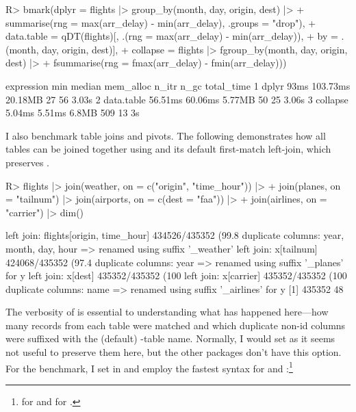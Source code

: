 \documentclass[nojss]{jss} %
\newcommand{\fct}[1]{\code{#1()}}
\begin{document}
%
\begin{Schunk}
\begin{Sinput}
R> bmark(dplyr = flights |> group_by(month, day, origin, dest) |>
+      summarise(rng = max(arr_delay) - min(arr_delay), .groups = "drop"),
+    data.table = qDT(flights)[, .(rng = max(arr_delay) - min(arr_delay)),
+                              by = .(month, day, origin, dest)],
+    collapse = flights |> fgroup_by(month, day, origin, dest) |>
+      fsummarise(rng = fmax(arr_delay) - fmin(arr_delay)))
\end{Sinput}
\begin{Soutput}
  expression     min   median mem_alloc n_itr n_gc total_time
1      dplyr    93ms 103.73ms   20.18MB    27   56      3.03s
2 data.table 56.51ms  60.06ms    5.77MB    50   25      3.06s
3   collapse  5.04ms   5.51ms     6.8MB   509   13         3s
\end{Soutput}
\end{Schunk}
%
I also benchmark table joins and pivots. The following demonstrates how all tables can be joined together using  and its default first-match left-join, which preserves .
%
\begin{Code}
R> flights |> join(weather, on = c("origin", "time_hour")) |>
+    join(planes, on = "tailnum") |> join(airports, on = c(dest = "faa")) |>
+    join(airlines, on = "carrier") |> dim()
\end{Code}
\begin{Schunk}
\begin{Soutput}
left join: flights[origin, time_hour] 434526/435352 (99.8%) <21.94:1st> weat
duplicate columns: year, month, day, hour => renamed using suffix '_weather'
left join: x[tailnum] 424068/435352 (97.4%) <87.62:1st> planes[tailnum] 4840
duplicate columns: year => renamed using suffix '_planes' for y
left join: x[dest] 435352/435352 (100%) <3689.42:1st> airports[faa] 118/1255
left join: x[carrier] 435352/435352 (100%) <31096.57:1st> airlines[carrier]
duplicate columns: name => renamed using suffix '_airlines' for y
[1] 435352     48
\end{Soutput}
\end{Schunk}
%
The verbosity of \fct{join} is essential to understanding what has happened here---how many records from each table were matched and which duplicate non-id columns were suffixed with the (default) -table name. Normally, I would set  as it seems not useful to preserve them here, but the other packages don't have this option. For the benchmark, I set  in  and employ the fastest syntax for  and :\footnote{ for  and  for .}
\end{document}
